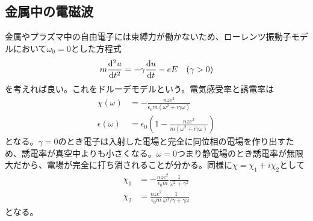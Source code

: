 \subsection{金属中の電磁波}
    金属やプラズマ中の自由電子には束縛力が働かないため、ローレンツ振動子モデルにおいて$\omega_0 = 0$とした方程式
        \[m\dv[2]{u}{t} =  -\gamma\dv{u}{t} - eE \quad (\gamma > 0)\]
    を考えれば良い。これをドルーデモデルという。電気感受率と誘電率は
    \begin{align*}
        \chi(\omega) &= -\frac{nze^2}{\epsilon_0m(\omega^2 + i\gamma\omega)}\\
        \epsilon(\omega) &= \epsilon_0\left(1 - \frac{nze^2}{m(\omega^2 + i\gamma\omega)}\right)
    \end{align*}
    となる。$\gamma = 0$のとき電子は入射した電場と完全に同位相の電場を作り出すため、誘電率が真空中よりも小さくなる。$\omega = 0$つまり静電場のとき誘電率が無限大だから、電場が完全に打ち消されることが分かる。同様に$\chi = \chi_1 + i\chi_2$として
    \begin{align*}
        \chi_1 &= -\frac{nze^2}{\epsilon_0m}\frac{1}{\omega^2 + \gamma^2}\\
        \chi_2 &= \frac{nze^2}{\epsilon_0m}\frac{1}{\omega^3 / \gamma + \gamma\omega}
    \end{align*}
    となる。

